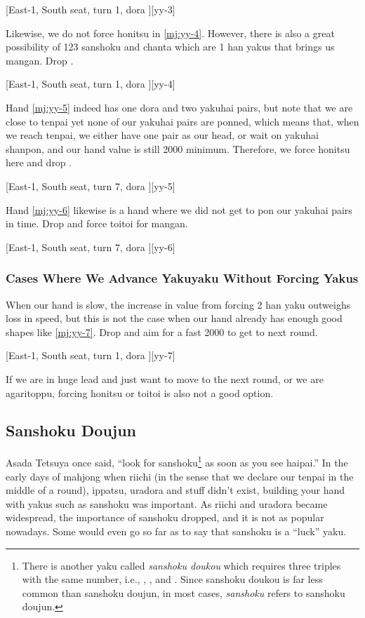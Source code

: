 \documentclass[12pt]{article}
\newlength\stdbls %
\newcommand{\mjfn}[1]{\raisebox{-.135\stdbls}{\mahjong[0.75\stdbls]{#1}}}
\begin{document}
[East-1, South seat, turn 1, dora ][yy-3]

Likewise, we do not force honitsu in \ref{mj:yy-4}. However, there is also a great possibility of 123 sanshoku and chanta which are 1 han yakus that brings us mangan. Drop .

[East-1, South seat, turn 1, dora ][yy-4]

Hand \ref{mj:yy-5} indeed has one dora and two yakuhai pairs, but note that we are close to tenpai yet none of our yakuhai pairs are ponned, which means that, when we reach tenpai, we either have one pair as our head, or wait on yakuhai shanpon, and our hand value is still 2000 minimum. Therefore, we force honitsu here and drop .

[East-1, South seat, turn 7, dora ][yy-5]

Hand \ref{mj:yy-6} likewise is a hand where we did not get to pon our yakuhai pairs in time. Drop  and force toitoi for mangan.

[East-1, South seat, turn 7, dora ][yy-6]


\subsubsection*{Cases Where We Advance Yakuyaku Without Forcing Yakus}

When our hand is slow, the increase in value from forcing 2 han yaku outweighs loss in speed, but this is not the case when our hand already has enough good shapes like \ref{mj:yy-7}. Drop  and aim for a fast 2000 to get to next round.

[East-1, South seat, turn 1, dora ][yy-7]

If we are in huge lead and just want to move to the next round, or we are agaritoppu, forcing honitsu or toitoi is also not a good option.


\subsection{Sanshoku Doujun}

Asada Tetsuya once said, ``look for sanshoku\footnote{There is another yaku called \textit{sanshoku doukou} which requires three triples with the same number, i.e., \mjfn{333m}, \mjfn{333p}, and \mjfn{333s}. Since sanshoku doukou is far less common than sanshoku doujun, in most cases, \textit{sanshoku} refers to sanshoku doujun.} as soon as you see haipai.'' In the early days of mahjong when riichi (in the sense that we declare our tenpai in the middle of a round), ippatsu, uradora and stuff didn't exist, building your hand with yakus such as sanshoku was important. As riichi and uradora became widespread, the importance of sanshoku dropped, and it is not as popular nowadays. Some would even go so far as to say that sanshoku is a ``luck'' yaku.
\end{document}
